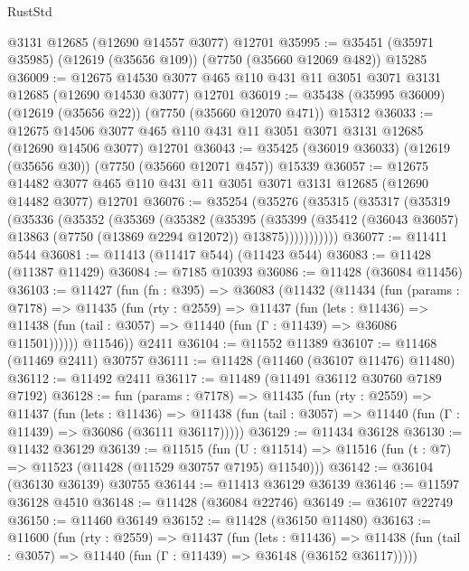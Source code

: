 \begin{lexlean}{RustStd}
\begin{coremodule}
    @3131
    @12685
    (@12690 @14557 @3077)
    @12701
@35995 := @35451 (@35971 @35985) (@12619 (@35656 @109)) (@7750 (@35660 @12069 @482)) @15285
@36009 := @12675
    @14530
    @3077
    @465
    @110
    @431
    @11
    @3051
    @3071
    @3131
    @12685
    (@12690 @14530 @3077)
    @12701
@36019 := @35438 (@35995 @36009) (@12619 (@35656 @22)) (@7750 (@35660 @12070 @471)) @15312
@36033 := @12675
    @14506
    @3077
    @465
    @110
    @431
    @11
    @3051
    @3071
    @3131
    @12685
    (@12690 @14506 @3077)
    @12701
@36043 := @35425 (@36019 @36033) (@12619 (@35656 @30)) (@7750 (@35660 @12071 @457)) @15339
@36057 := @12675
    @14482
    @3077
    @465
    @110
    @431
    @11
    @3051
    @3071
    @3131
    @12685
    (@12690 @14482 @3077)
    @12701
@36076 := @35254
    (@35276
      (@35315
        (@35317
          (@35319
            (@35336
              (@35352
                (@35369
                  (@35382
                    (@35395
                      (@35399
                        (@35412
                          (@36043 @36057)
                          @13863
                          (@7750 (@13869 @2294 @12072))
                          @13875)))))))))))
@36077 := @11411 @544
@36081 := @11413 (@11417 @544) (@11423 @544)
@36083 := @11428 (@11387 @11429)
@36084 := @7185 @10393
@36086 := @11428 (@36084 @11456)
@36103 := @11427
    (fun (fn : @395) =>
    @36083
      (@11432
        (@11434
          (fun (params : @7178) =>
          @11435
            (fun (rty : @2559) =>
            @11437
              (fun (lets : @11436) =>
              @11438 (fun (tail : @3057) => @11440 (fun (Γ : @11439) => @36086 @11501))))))
        @11546))
    @2411
@36104 := @11552 @11389
@36107 := @11468 (@11469 @2411) @30757
@36111 := @11428 (@11460 (@36107 @11476) @11480)
@36112 := @11492 @2411
@36117 := @11489 (@11491 @36112 @30760 @7189 @7192)
@36128 := fun (params : @7178) =>
  @11435
    (fun (rty : @2559) =>
    @11437
      (fun (lets : @11436) =>
      @11438 (fun (tail : @3057) => @11440 (fun (Γ : @11439) => @36086 (@36111 @36117)))))
@36129 := @11434 @36128
@36130 := @11432 @36129
@36139 := @11515
    (fun (U : @11514) => @11516 (fun (t : @7) => @11523 (@11428 (@11529 @30757 @7195) @11540)))
@36142 := @36104 (@36130 @36139) @30755
@36144 := @11413 @36129 @36139
@36146 := @11597 @36128 @4510
@36148 := @11428 (@36084 @22746)
@36149 := @36107 @22749
@36150 := @11460 @36149
@36152 := @11428 (@36150 @11480)
@36163 := @11600
    (fun (rty : @2559) =>
    @11437
      (fun (lets : @11436) =>
      @11438 (fun (tail : @3057) => @11440 (fun (Γ : @11439) => @36148 (@36152 @36117)))))

\end{coremodule}
\end{lexlean}
